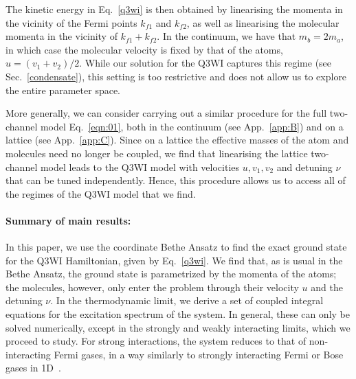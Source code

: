 \documentclass[aps,pra,
superscriptaddress,
reprint,twocolumn,preprintnumbers,
amsmath,amssymb,
nofootinbib]{revtex4-1}
\begin{document}
The kinetic energy in Eq.~\eqref{q3wi} is then obtained by linearising the momenta in the vicinity of the Fermi points $k_{f1}$ and $k_{f2}$, as well
as linearising the molecular momenta in the vicinity of $k_{f1}+k_{f2}$. In the continuum, we have that $m_b = 2 m_a$, in which case the molecular velocity is fixed by that of the atoms, $u = (v_1 + v_2)/2$. While our solution for the Q3WI captures this regime (see Sec.~\ref{condensate}), this setting is too restrictive and does not allow us to explore the entire parameter space.

More generally, we can consider carrying out a similar procedure for the full two-channel model Eq.~\eqref{eqn:01}, both in the continuum (see App.~\ref{app:B}) and on a lattice (see App.~\ref{app:C}). Since on a lattice the effective masses of the atom and molecules need no longer be coupled, we find that linearising the lattice two-channel model leads to the Q3WI model with velocities $u,v_1,v_2$ and detuning $\nu$ that can be tuned independently. Hence, this procedure allows us to access all of the regimes of the Q3WI model that we find. 

\paragraph*{\bf{Summary of main results:}}
In this paper, we use the coordinate Bethe Ansatz to find the exact ground state for the Q3WI Hamiltonian, given by Eq.~\eqref{q3wi}. We find that, as is usual in the Bethe Ansatz, the ground state is parametrized by the momenta of the atoms; the molecules, however, only enter the problem through their velocity $u$ and the detuning $\nu$. In the thermodynamic limit, we derive a set of coupled integral equations for the excitation spectrum of the system. In general, these can only be solved numerically, except in the strongly and weakly interacting limits, which we proceed to study. For strong interactions, the system reduces to that of non-interacting Fermi gases, in a way similarly to strongly interacting Fermi or Bose gases in 1D~\cite{LiebLiniger,Lieb1963}.
\end{document}
